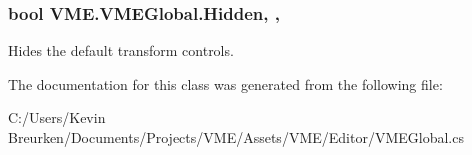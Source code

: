 \subsubsection[{\texorpdfstring{Hidden}{Hidden}}]{\setlength{\rightskip}{0pt plus 5cm}bool V\+M\+E.\+V\+M\+E\+Global.\+Hidden\hspace{0.3cm}{\ttfamily [static]}, {\ttfamily [get]}, {\ttfamily [set]}}\hypertarget{class_v_m_e_1_1_v_m_e_global_ae53c2b25ceae18d5585ced3817c65e20}{}\label{class_v_m_e_1_1_v_m_e_global_ae53c2b25ceae18d5585ced3817c65e20}


Hides the default transform controls. 



The documentation for this class was generated from the following file\+:\begin{DoxyCompactItemize}
\item 
C\+:/\+Users/\+Kevin Breurken/\+Documents/\+Projects/\+V\+M\+E/\+Assets/\+V\+M\+E/\+Editor/V\+M\+E\+Global.\+cs\end{DoxyCompactItemize}
